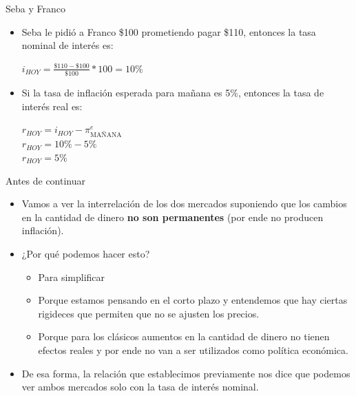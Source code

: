 \documentclass{beamer}
\begin{document}
\begin{frame}{Seba y Franco}
    \begin{itemize}
        \item Seba le pidió a Franco \$100 prometiendo pagar \$110, entonces la tasa nominal de interés es:
        \begin{center}
            $i_{HOY}=\frac{\$110 - \$100}{\$100} * 100 = 10\%$
        \end{center}
            \vspace{2mm}
        \item Si la tasa de inflación esperada para mañana es 5\%, entonces la tasa de interés real es: \\
        \begin{center}
            $r_{HOY} = i_{HOY}-\pi_{\text{MAÑANA}}^e$ \\
            \vspace{2mm}
            $r_{HOY} = 10\%-5\% $ \\
            \vspace{2mm}
            $r_{HOY} = 5\%$
        \end{center}
    \end{itemize}
\end{frame}

\begin{frame}{Antes de continuar}
    \begin{itemize}
        \item Vamos a ver la interrelación de los dos mercados suponiendo que los cambios en la cantidad de dinero \textbf{no son permanentes} (por ende no producen inflación).
        \item ¿Por qué podemos hacer esto?
        \begin{itemize}
            \item Para simplificar 
            \item Porque estamos pensando en el corto plazo y entendemos que hay ciertas rigideces que permiten que no se ajusten los precios.
            \item Porque para los clásicos aumentos en la cantidad de dinero no tienen efectos reales y por ende no van a ser utilizados como política económica.
        \end{itemize}
        \item De esa forma, la relación que establecimos previamente nos dice que podemos ver ambos mercados solo con la tasa de interés nominal.
    \end{itemize}
    
\end{frame}
\end{document}

